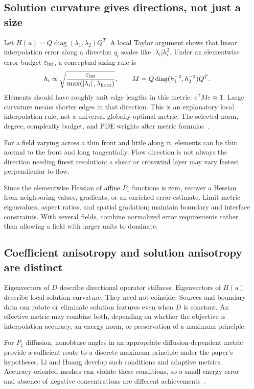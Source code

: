 \documentclass[11pt,a4paper]{article}
\newcommand{\abs}[1]{\left\lvert #1\right\rvert}
\begin{document}
\subsection{Solution curvature gives directions, not just a size}
Let $H(u)=Q\operatorname{diag}(\lambda_1,\lambda_2)Q^T$. A local Taylor argument shows that linear interpolation error along a direction $q_i$ scales like $\abs{\lambda_i}h_i^2$. Under an elementwise error budget $\varepsilon_{\rm int}$, a conceptual sizing rule is
\begin{equation}\label{eq:metric}
h_i\propto\sqrt{\frac{\varepsilon_{\rm int}}
{\max(\abs{\lambda_i},\lambda_{\rm floor})}},\qquad
M=Q\operatorname{diag}(h_1^{-2},h_2^{-2})Q^T.
\end{equation}
Elements should have roughly unit edge lengths in this metric: $e^TMe\approx1$. Large curvature means shorter edges in that direction. This is an explanatory local interpolation rule, not a universal globally optimal metric. The selected norm, degree, complexity budget, and PDE weights alter metric formulas~\cite{freefem}.

For a field varying across a thin front and little along it, elements can be thin normal to the front and long tangentially. Flow direction is not always the direction needing finest resolution: a shear or crosswind layer may vary fastest perpendicular to flow.

Since the elementwise Hessian of affine $P_1$ functions is zero, recover a Hessian from neighboring values, gradients, or an enriched error estimate. Limit metric eigenvalues, aspect ratios, and spatial gradation; maintain boundary and interface constraints. With several fields, combine normalized error requirements rather than allowing a field with larger units to dominate.

\subsection{Coefficient anisotropy and solution anisotropy are distinct}
Eigenvectors of $D$ describe directional operator stiffness. Eigenvectors of $H(u)$ describe local solution curvature. They need not coincide. Sources and boundary data can rotate or eliminate solution features even when $D$ is constant. An effective metric may combine both, depending on whether the objective is interpolation accuracy, an energy norm, or preservation of a maximum principle.

For $P_1$ diffusion, nonobtuse angles in an appropriate diffusion-dependent metric provide a sufficient route to a discrete maximum principle under the paper's hypotheses. Li and Huang develop such conditions and adaptive metrics. Accuracy-oriented meshes can violate these conditions, so a small energy error and absence of negative concentrations are different achievements~\cite{lihuang}.
\end{document}
